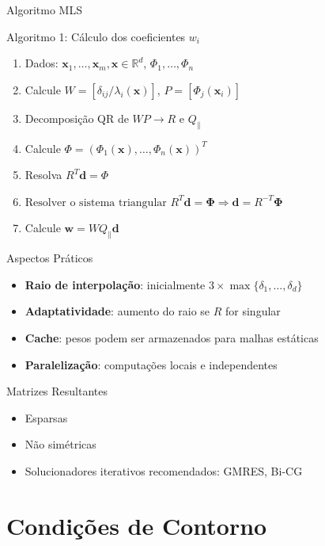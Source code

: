 \documentclass[../main/main.tex]{subfiles}
\begin{document}
\begin{frame}{Algoritmo MLS}
\begin{block}{Algoritmo 1: Cálculo dos coeficientes $w_i$}
\begin{enumerate}
\item Dados: $\mathbf{x}_1, \ldots, \mathbf{x}_m, \mathbf{x} \in \mathbb{R}^d$, $\Phi_1, \ldots, \Phi_n$
\item Calcule $W = [\delta_{ij}/\lambda_i(\mathbf{x})]$, $P = [\Phi_j(\mathbf{x}_i)]$
\item Decomposição QR de $WP \rightarrow R$ e $Q_\parallel$
\item Calcule $\Phi = (\Phi_1(\mathbf{x}), \ldots, \Phi_n(\mathbf{x}))^T$
\item Resolva $R^T \mathbf{d} = \Phi$
\item $\text{Resolver o sistema triangular } R^T \mathbf{d} = \mathbf{\Phi} \Rightarrow \mathbf{d} = R^{-T} \mathbf{\Phi}$
\item Calcule $\mathbf{w} = W Q_\parallel \mathbf{d}$
\end{enumerate}
\end{block}
\end{frame}

\begin{frame}{Aspectos Práticos}
\begin{itemize}
\item \textbf{Raio de interpolação}: inicialmente $3 \times \max\{\delta_1, \ldots, \delta_d\}$
\item \textbf{Adaptatividade}: aumento do raio se $R$ for singular
\item \textbf{Cache}: pesos podem ser armazenados para malhas estáticas
\item \textbf{Paralelização}: computações locais e independentes
\end{itemize}

\begin{block}{Matrizes Resultantes}
\begin{itemize}
\item Esparsas
\item Não simétricas
\item Solucionadores iterativos recomendados: GMRES, Bi-CG
\end{itemize}
\end{block}
\end{frame}

\section{Condições de Contorno}
\end{document}

